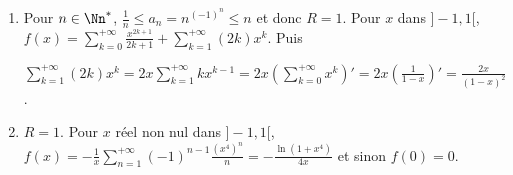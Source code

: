 {{\begin{enumerate}
Donc, pour tout réel $x$,

\begin{center}
$f(x) =\sum_{n=0}^{+\infty}\frac{(n+2)(n+1)n}{(n+2)!}x^n +2\sum_{n=0}^{+\infty}\frac{(n+2)(n+1)}{(n+2)!}x^n- 5\sum_{n=0}^{+\infty}\frac{n+2}{(n+2)!}x^n+ 5\sum_{n=0}^{+\infty}\frac{1}{(n+2)!}x^n.$
\end{center}

Ensuite $f(0) = -\frac{1}{2}$  et pour $x\neq 0$,

\begin{align*}
f(x)&=\sum_{n=1}^{+\infty}\frac{1}{(n-1)!}x^n +2\sum_{n=0}^{+\infty}\frac{1}{n!}x^n- 5\sum_{n=0}^{+\infty}\frac{1}{(n+1)!}x^n+ 5\sum_{n=0}^{+\infty}\frac{1}{(n+2)!}x^n\\
 &= xe^x + 2e^x -5\frac{e^x-1}{x}+ 5\frac{e^x-1-x}{x^2}= \frac{e^x(x^3+2x^2-5x+5) -5x}{x^2}.
\end{align*}

\begin{center}
\end{center}

\item  Pour $n\in\Nn^*$,  $\frac{1}{n}\leqslant a_n=n^{(-1)^n}\leqslant n$ et donc $R = 1$. Pour $x$ dans $]-1,1[$, $f(x)=\sum_{k=0}^{+\infty}\frac{x^{2k+1}}{2k+1}+\sum_{k=1}^{+\infty}(2k)x^k$. Puis 

\begin{center}
$\sum_{k=1}^{+\infty}(2k)x^k= 2x\sum_{k=1}^{+\infty}kx^{k-1}= 2x\left(\sum_{k=0}^{+\infty}x^k\right)'= 2x\left(\frac{1}{1-x}\right)'=\frac{2x}{(1-x)^2}$.
\end{center}

\begin{center}
\shadowbox{
$\forall x\in]-1,1[$, $\sum_{n=1}^{+\infty}n^{(-1)^n}x^n=\Argth x+\frac{2x}{(1-x)^2}$.
}
\end{center}

\item  $R = 1$. Pour $x$ réel non nul dans $]-1,1[$, $f(x)=-\frac{1}{x}\sum_{n=1}^{+\infty}(-1)^{n-1}\frac{(x^4)^n}{n}= -\frac{\ln(1+x^4)}{4x}$ et sinon $f(0) = 0$.

\begin{center}
\shadowbox{
$\forall x\in]-1,1[$, $\sum_{n=1}^{+\infty}(-1)^n\frac{x^{4n-1}}{4n}=\left\{
\begin{array}{l}
-\frac{\ln(1+x^4)}{4x}\;\text{si}\;x\neq0\\
\rule{0mm}{4mm}0\;\text{si}\;x=0
\end{array}
\right.$.
}
\end{center}


\end{enumerate}}}

